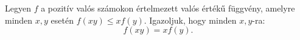 Legyen $f$ a pozitív valós számokon értelmezett valós értékű függvény,
amelyre minden $x, y$ esetén $f(xy) \le xf (y)$. Igazoljuk, hogy minden 
$x,y$-ra:
$$
f (xy) = xf (y).
$$
